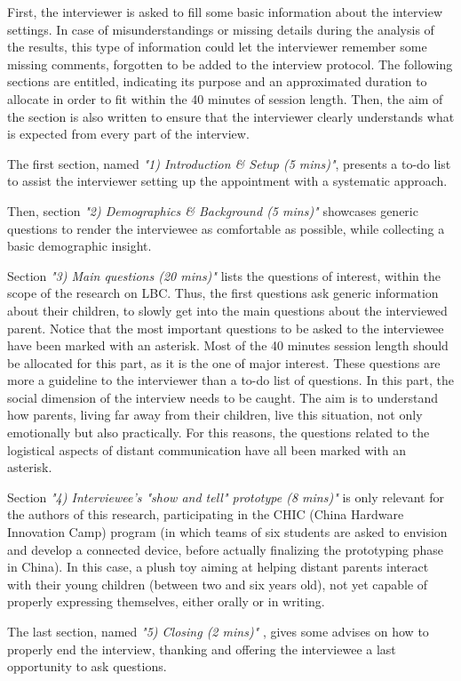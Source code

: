 First, the interviewer is asked to fill some basic information about the interview settings. In case of misunderstandings or missing details during the analysis of the results, this type of information could let the interviewer remember some missing comments, forgotten to be added to the interview protocol. The following sections are entitled, indicating its purpose and an approximated duration to allocate in order to fit within the 40 minutes of session length. Then, the aim of the section is also written to ensure that the interviewer clearly understands what is expected from every part of the interview. 

The first section, named \textit{"1) Introduction \& Setup (5 mins)"}, presents a to-do list to assist the interviewer setting up the appointment with a systematic approach.

Then, section \textit{"2) Demographics \& Background (5 mins)"} showcases generic questions to render the interviewee as comfortable as possible, while collecting a basic demographic insight. 

Section \textit{"3) Main questions (20 mins)"} lists the questions of interest, within the scope of the research on LBC. Thus, the first questions ask generic information about their children, to slowly get into the main questions about the interviewed parent. Notice that the most important questions to be asked to the interviewee have been marked with an asterisk. Most of the 40 minutes session length should be allocated for this part, as it is the one of major interest. These questions are more a guideline to the interviewer than a to-do list of questions. In this part, the social dimension of the interview needs to be caught. The aim is to understand how parents, living far away from their children, live this situation, not only emotionally but also practically. For this reasons, the questions related to the logistical aspects of distant communication have all been marked with an asterisk.

Section \textit{"4) Interviewee's "show and tell" prototype (8 mins)"} is only relevant for the authors of this research, participating in the CHIC (China Hardware Innovation Camp) program (in which teams of six students are asked to envision and develop a connected device, before actually finalizing the prototyping phase in China). In this case, a plush toy aiming at helping distant parents interact with their young children (between two and six years old), not yet capable of properly expressing themselves, either orally or in writing.

The last section, named \textit{"5) Closing (2 mins)"
}, gives some advises on how to properly end the interview, thanking and offering the interviewee a last opportunity to ask questions.